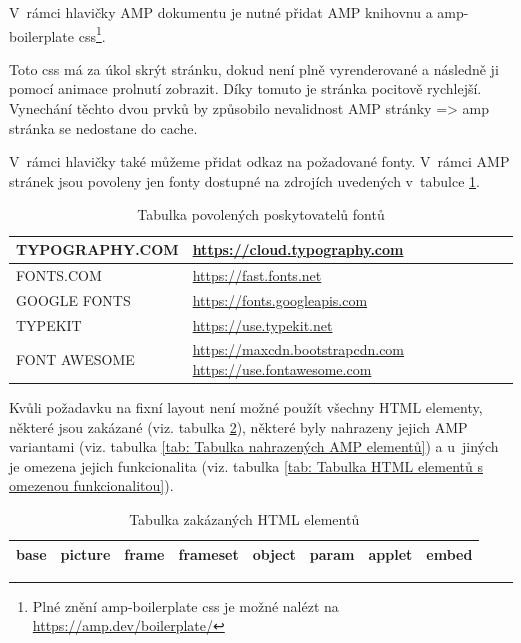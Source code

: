 V~rámci hlavičky AMP dokumentu je nutné přidat AMP knihovnu a amp-boilerplate css\footnote{Plné znění amp-boilerplate css je možné nalézt na \url{https://amp.dev/boilerplate/}}\cite{AMPBoilerplate}.

Toto css má za úkol skrýt stránku, dokud není plně vyrenderované a následně ji pomocí animace prolnutí zobrazit. Díky tomuto je stránka pocitově rychlejší.
Vynechání těchto dvou prvků by způsobilo nevalidnost AMP stránky => amp stránka se nedostane do cache.

V~rámci hlavičky také můžeme přidat odkaz na požadované fonty. V~rámci AMP stránek jsou povoleny jen fonty dostupné na zdrojích uvedených v~tabulce \ref{tab:Tabulka povolených zdrojů fontů}\cite{ampCustomFonts}.

\begin{table}[H]
	\caption{Tabulka povolených poskytovatelů fontů}
	\centering
	\begin{tabular}{m{10em} | m{20em}}
		\toprule
		\cmidrule(r){1-2}
		TYPOGRAPHY.COM & \url{https://cloud.typography.com} \\ \midrule
		FONTS.COM & \url{https://fast.fonts.net} \\ \midrule
		GOOGLE FONTS & \url{https://fonts.googleapis.com} \\ \midrule
		TYPEKIT & \url{https://use.typekit.net} \\ \midrule
		FONT AWESOME & \url{https://maxcdn.bootstrapcdn.com} \newline \url{https://use.fontawesome.com} \\
		\bottomrule
	\end{tabular}
	\label{tab:Tabulka povolených zdrojů fontů}
\end{table}

Kvůli požadavku na fixní layout není možné použít všechny HTML elementy, některé jsou zakázané (viz. tabulka \ref{tab: Tabulka zakázaných HTML elementů}), některé byly nahrazeny jejich AMP variantami (viz. tabulka \ref{tab: Tabulka nahrazených AMP elementů}) a u~jiných je omezena jejich funkcionalita (viz. tabulka \ref{tab: Tabulka HTML elementů s omezenou funkcionalitou})\cite[p.\ 41]{AMP-ENG-Book}.

\begin{table}[H]
	\caption{Tabulka zakázaných HTML elementů} 
	\centering
	\begin{tabular}{c|c|c|c|c|c|c|c}
		\toprule
		base & picture & frame & frameset & object & param & applet & embed \\
		\bottomrule
	\end{tabular}
	\label{tab: Tabulka zakázaných HTML elementů}
\end{table}

